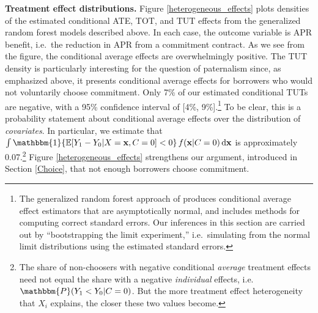 \documentclass[11pt, a4paper]{article}
\begin{document}
\vspace{.2in}
\noindent \textbf{Treatment effect distributions.} Figure \ref{heterogeneous_effects} plots densities of the estimated conditional ATE, TOT, and TUT effects from the generalized random forest models described above.
In each case, the outcome variable is APR benefit, i.e.\ the reduction in APR from a commitment contract.
As we see from the figure, the conditional average effects are overwhelmingly positive. 
The TUT density is particularly interesting for the question of paternalism since, as emphasized above, it presents conditional average effects for borrowers who would not voluntarily choose commitment.
Only 7\% of our estimated conditional TUTs are negative, with a 95\% confidence interval of [4\%, 9\%].\footnote{The generalized random forest approach of \cite{atheygrf} produces conditional average effect estimators that are asymptotically normal, and includes methods for computing correct standard errors. %
Our inferences in this section are carried out by ``bootstrapping the limit experiment,'' i.e.\ simulating from the normal limit distributions using the estimated standard errors.} 
To be clear, this is a probability statement about conditional average effects over the distribution of \emph{covariates}.
In particular, we estimate that  $\int \mathbbm{1}\{\mathbb{E}[Y_1 - Y_0| X = \mathbf{x}, C = 0] < 0\} \, f(\mathbf{x}|C=0) \, \mathrm{d}\mathbf{x}$ is approximately 0.07.\footnote{The share of non-choosers with negative conditional \emph{average} treatment effects need not equal the share with a negative \emph{individual} effects, i.e.\ $\mathbbm{P}(Y_1 < Y_0| C = 0)$.
But the more treatment effect heterogeneity that $X_i$ explains, the closer these two values become.}
Figure \ref{heterogeneous_effects} strengthens our argument, introduced in Section \ref{Choice}, that not enough borrowers choose commitment. 
\end{document}
